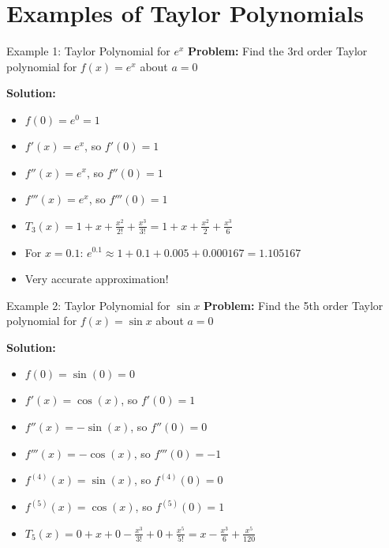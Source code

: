 \documentclass[aspectratio=169]{beamer}
\begin{document}
\section{Examples of Taylor Polynomials}

\begin{frame}{Example 1: Taylor Polynomial for $e^x$}
\textbf{Problem:} Find the 3rd order Taylor polynomial for $f(x) = e^x$ about $a = 0$

\textbf{Solution:}
\begin{itemize}
    \item $f(0) = e^0 = 1$
    \item $f'(x) = e^x$, so $f'(0) = 1$
    \item $f''(x) = e^x$, so $f''(0) = 1$
    \item $f'''(x) = e^x$, so $f'''(0) = 1$
    \item $T_3(x) = 1 + x + \frac{x^2}{2!} + \frac{x^3}{3!} = 1 + x + \frac{x^2}{2} + \frac{x^3}{6}$
    \item For $x = 0.1$: $e^{0.1} \approx 1 + 0.1 + 0.005 + 0.000167 = 1.105167$
    \item Very accurate approximation!
\end{itemize}
\end{frame}

\begin{frame}{Example 2: Taylor Polynomial for $\sin x$}
\textbf{Problem:} Find the 5th order Taylor polynomial for $f(x) = \sin x$ about $a = 0$

\textbf{Solution:}
\begin{itemize}
    \item $f(0) = \sin(0) = 0$
    \item $f'(x) = \cos(x)$, so $f'(0) = 1$
    \item $f''(x) = -\sin(x)$, so $f''(0) = 0$
    \item $f'''(x) = -\cos(x)$, so $f'''(0) = -1$
    \item $f^{(4)}(x) = \sin(x)$, so $f^{(4)}(0) = 0$
    \item $f^{(5)}(x) = \cos(x)$, so $f^{(5)}(0) = 1$
    \item $T_5(x) = 0 + x + 0 - \frac{x^3}{3!} + 0 + \frac{x^5}{5!} = x - \frac{x^3}{6} + \frac{x^5}{120}$
\end{itemize}
\end{frame}
\end{document}
